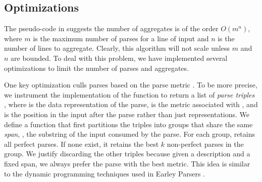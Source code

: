 
\subsection{Optimizations}
The pseudo-code in  suggests the number of
aggregates is of the order $O(m ^ n)$, where $m$ is the maximum number of
parses for a line of input  and $n$ is the number of lines to
aggregate.  Clearly, this algorithm will not scale 
unless $m$ and $n$ are bounded.  To deal with this problem,
we have implemented several optimizations to limit the number of 
parses and aggregates. 

One key optimization culls parses based on 
the parse metric . 
To be more precise, we instrument the implementation of the  function 
to return a list of 
{\em parse triples} , where  is the data representation of
the parse,  is the metric associated with , and
 is the position in the input after the parse rather than just representations.
We define a  function that first partitions the
triples into groups that share the same 
{\em span}, \ie{}, the substring of the input consumed by the parse.
For each group,  retains all perfect parses. If 
none exist, it retains the best $k$ non-perfect parses in the group. 
We justify discarding the other triples because
given a description  and a fixed span, we always
prefer the parse with the best metric. This idea is
similar to the dynamic programming techniques used in 
Earley Parsers \cite{earley-parser}. 


